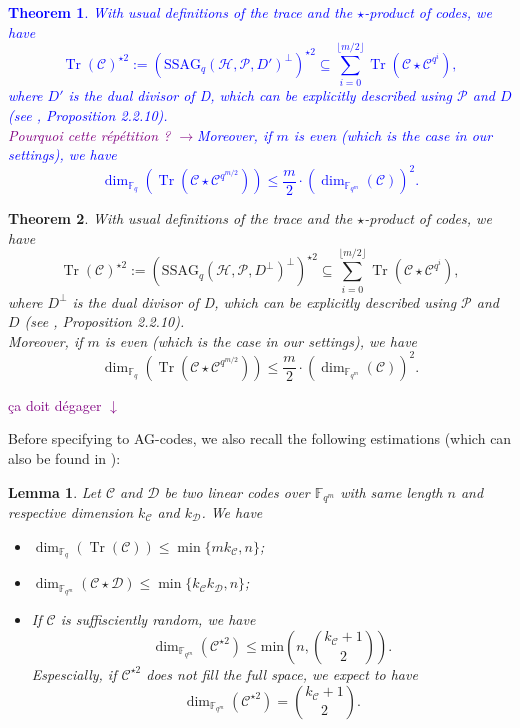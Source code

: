 \documentclass[a4paper]{article}
\newtheorem{thm}{Theorem}
\newtheorem{lem1}{Lemma}
\newcommand{\calP}{\mathcal{P}}
\newcommand{\calH}{\mathcal{H}}
\newcommand{\calC}{\mathcal{C}}
\newcommand{\calD}{\mathcal{D}}
\newcommand{\Tr}{\operatorname{Tr}}
\newcommand{\fqm}{\mathbb{F}_{q^m}}
\newcommand\jade[1]{\textcolor{purple}{#1}}
\begin{document}
\textcolor{blue}{
	\begin{thm} \label{th1}
		With usual definitions of the trace and the $\star$-product of codes, we have 
		\[ \Tr(\mathcal{C})^{\star2} := (\mathrm{SSAG}_{q}(\calH,\calP,D')^{\perp})^{\star2} \subseteq \sum\limits_{i=0}^{\lfloor{m/2} \rfloor} \Tr(\mathcal{C}\star\mathcal{C}^{q^i}),\]
		where $D'$ is the dual divisor of D, which can be explicitly described using $\calP$ and $D$ (see \cite{sti}, Proposition 2.2.10). \\
		\jade{Pourquoi cette répétition ? $\rightarrow$}Moreover, if $m$ is even (which is the case in our settings), we have 
		\[\dim_{\mathbb{F}_q}(\Tr(\calC \star \calC^{q^{m/2}})) \leq \frac{m}{2}\cdot (\dim_{\fqm}(\calC))^2.\]
	\end{thm}
}


\begin{thm} \label{th1}
With usual definitions of the trace and the $\star$-product of codes, we have 
\[ \Tr(\mathcal{C})^{\star2} := (\mathrm{SSAG}_{q}(\calH,\calP,D^{\perp})^{\perp})^{\star2} \subseteq \sum\limits_{i=0}^{\lfloor{m/2} \rfloor} \Tr(\mathcal{C}\star\mathcal{C}^{q^i}),\]
where $D^{\perp}$ is the dual divisor of D, which can be explicitly described using $\calP$ and $D$ (see \cite{sti}, Proposition 2.2.10). \\
Moreover, if $m$ is even (which is the case in our settings), we have 
\[\dim_{\mathbb{F}_q}(\Tr(\calC \star \calC^{q^{m/2}})) \leq \frac{m}{2}\cdot (\dim_{\fqm}(\calC))^2.\]
\end{thm}

\jade{ça doit dégager $\downarrow$}
{\color{red}

Before specifying to AG-codes, we also recall the following estimations (which can also be found in \cite{rocco}):

\begin{lem1} \label{known_bounds}
Let $\calC$ and $\calD$ be two linear codes over $\fqm$ with same length $n$ and respective dimension $k_{\calC}$ and $k_{\calD}$. We have
\begin{itemize}
    \item[$(1)$] $\dim_{\mathbb{F}_q}(\Tr(\calC)) \leq \min\{mk_{\calC},n\}$;
    \item[$(2)$] $\dim_{\fqm}(\calC \star \calD) \leq \min\{k_{\calC}k_{\calD},n\}$;
    \item[$(3)$] If $\calC$ is suffisciently random, we have
     \[ \dim_{\mathbb{F}_{q^m}}(\calC^{\star2}) \leq \mathrm{min}\left(n,\binom{k_{\calC}+1}{2}\right) . \]
     Espescially, if $\calC^{\star2}$ does not fill the full space, we expect to have 
     \[ \dim_{\mathbb{F}_{q^m}}(\calC^{\star2}) = \binom{k_{\calC}+1}{2}.\]
\end{itemize}
\end{lem1}
}
\end{document}
